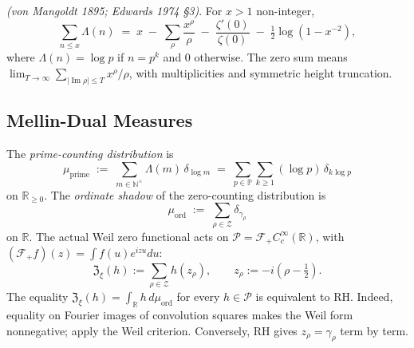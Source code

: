 \begin{proposition}
\label{v4-arith:w9-r4:prop:rvm}
\ClaimStatusProvedElsewhere \emph{(von Mangoldt 1895; Edwards 1974 \S3)}.
For \(x>1\) non-integer,
\begin{equation}
\label{v4-arith:w9-r4:eq:rvm}
\sum_{n\leq x}\Lambda(n)\;=\;x\;-\;\sum_{\rho}\frac{x^{\rho}}{\rho}\;-\;\frac{\zeta'(0)}{\zeta(0)}\;-\;\tfrac12\log(1-x^{-2}),
\end{equation}
where \(\Lambda(n)=\log p\) if \(n=p^k\) and \(0\) otherwise.
The zero sum means
\(\lim_{T\to\infty}\sum_{|\operatorname{Im}\rho|\leq T}x^\rho/\rho\),
with multiplicities and symmetric height truncation.
\end{proposition}

\subsection{Mellin-Dual Measures}
\label{v4-arith:w9-r4:mh:mellin-dual}

\begin{definition}
\label{v4-arith:w9-r4:def:counting-measures}
\ClaimStatusDefinitional The \emph{prime-counting distribution} is
\begin{equation}
\label{v4-arith:w9-r4:eq:mu-prime}
\mu_{\mathrm{prime}}\;:=\;\sum_{m\in\mathbb{N}^{\times}}\Lambda(m)\,\delta_{\log m}\;=\;\sum_{p\in\mathbb{P}}\sum_{k\geq 1}(\log p)\,\delta_{k\log p}
\end{equation}
on \(\mathbb{R}_{\geq 0}\). The \emph{ordinate shadow} of the
zero-counting distribution is
\begin{equation}
\label{v4-arith:w9-r4:eq:mu-zero}
\mu_{\mathrm{ord}}\;:=\;\sum_{\rho\in\mathcal{Z}}\delta_{\gamma_{\rho}}
\end{equation}
on \(\mathbb{R}\). The actual Weil zero functional acts on
\(\mathscr P=\mathcal F_+C_c^\infty(\mathbb R)\), with
\((\mathcal F_+f)(z)=\int f(u)e^{izu}du\):
\[
\mathfrak Z_{\xi}(h):=\sum_{\rho\in\mathcal Z}h(z_{\rho}),
\qquad
z_{\rho}:=-i(\rho-\tfrac12).
\]
The equality \(\mathfrak Z_{\xi}(h)=\int_{\mathbb R}h\,d\mu_{\mathrm{ord}}\)
for every \(h\in\mathscr P\) is equivalent to RH.
Indeed, equality on Fourier images of convolution squares makes
the Weil form nonnegative; apply the Weil criterion.
Conversely, RH gives \(z_\rho=\gamma_\rho\) term by term.
\end{definition}

